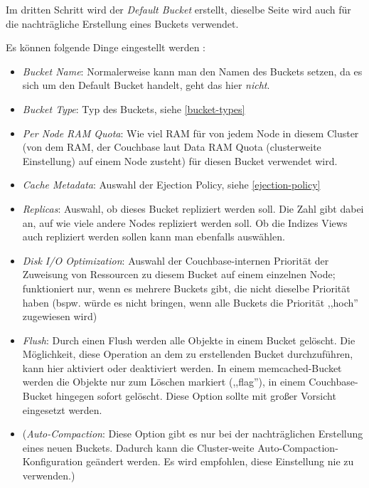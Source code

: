 Im dritten Schritt wird der \textit{Default Bucket} erstellt, dieselbe Seite wird auch für die nachträgliche Erstellung eines Buckets verwendet.

Es können folgende Dinge eingestellt werden \cite{couchbase-new-bucket}:
\begin{itemize}
	\item \textit{Bucket Name}: Normalerweise kann man den Namen des Buckets setzen, da es sich um den Default Bucket handelt, geht das hier \textit{nicht}.
	\item \textit{Bucket Type}: Typ des Buckets, siehe \ref{bucket-types}
	\item \textit{Per Node RAM Quota}: Wie viel RAM für von jedem Node in diesem Cluster (von dem RAM, der Couchbase laut Data RAM Quota (clusterweite Einstellung) auf einem Node zusteht) für diesen Bucket verwendet wird.
	\item \textit{Cache Metadata}: Auswahl der Ejection Policy, siehe \ref{ejection-policy}
	\item \textit{Replicas}: Auswahl, ob dieses Bucket repliziert werden soll. Die Zahl gibt dabei an, auf wie viele andere Nodes repliziert werden soll. Ob die Indizes Views auch repliziert werden sollen kann man ebenfalls auswählen.
	\item \textit{Disk I/O Optimization}: Auswahl der Couchbase-internen Priorität der Zuweisung von Ressourcen zu diesem Bucket auf einem einzelnen Node; funktioniert nur, wenn es mehrere Buckets gibt, die nicht dieselbe Priorität haben (bspw. würde es nicht bringen, wenn alle Buckets die Priorität ,,hoch'' zugewiesen wird)
	\item \textit{Flush}: Durch einen Flush werden alle Objekte in einem Bucket gelöscht. Die Möglichkeit, diese Operation an dem zu erstellenden Bucket durchzuführen, kann hier aktiviert oder deaktiviert werden. In einem memcached-Bucket werden die Objekte nur zum Löschen markiert (,,flag''), in einem Couchbase-Bucket hingegen sofort gelöscht. Diese Option sollte mit großer Vorsicht eingesetzt werden.
	\item (\textit{Auto-Compaction}: Diese Option gibt es nur bei der nachträglichen Erstellung eines neuen Buckets. Dadurch kann die Cluster-weite Auto-Compaction-Konfiguration geändert werden. Es wird empfohlen, diese Einstellung nie zu verwenden.)
\end{itemize}

